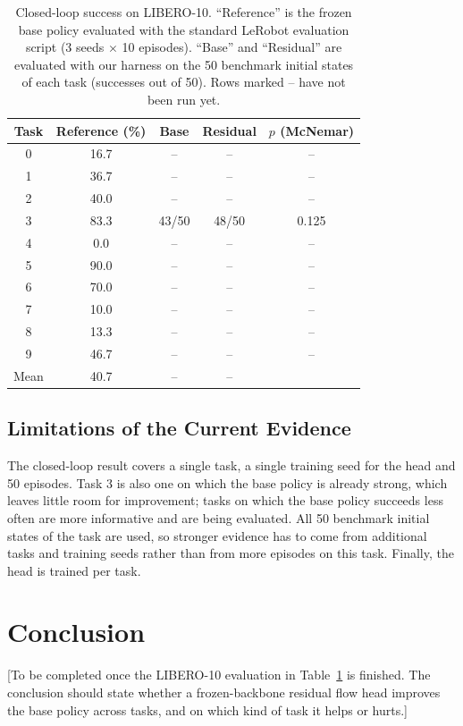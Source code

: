\documentclass[conference]{IEEEtran}
\begin{document}
\begin{table}[t]
\centering
\caption{Closed-loop success on LIBERO-10. ``Reference'' is the frozen base policy evaluated with the standard LeRobot evaluation script (3 seeds $\times$ 10 episodes). ``Base'' and ``Residual'' are evaluated with our harness on the 50 benchmark initial states of each task (successes out of 50). Rows marked -- have not been run yet.}
\label{tab:results}
\begin{tabular}{ccccc}
\toprule
Task & Reference (\%) & Base & Residual & $p$ (McNemar) \\
\midrule
0 & 16.7 & -- & -- & -- \\
1 & 36.7 & -- & -- & -- \\
2 & 40.0 & -- & -- & -- \\
3 & 83.3 & 43/50 & 48/50 & 0.125 \\
4 & 0.0  & -- & -- & -- \\
5 & 90.0 & -- & -- & -- \\
6 & 70.0 & -- & -- & -- \\
7 & 10.0 & -- & -- & -- \\
8 & 13.3 & -- & -- & -- \\
9 & 46.7 & -- & -- & -- \\
\midrule
Mean & 40.7 & -- & -- & \\
\bottomrule
\end{tabular}
\end{table}

\subsection{Limitations of the Current Evidence}
The closed-loop result covers a single task, a single training seed for the head and 50 episodes. Task 3 is also one on which the base policy is already strong, which leaves little room for improvement; tasks on which the base policy succeeds less often are more informative and are being evaluated. All 50 benchmark initial states of the task are used, so stronger evidence has to come from additional tasks and training seeds rather than from more episodes on this task. Finally, the head is trained per task.

\section{Conclusion}

[To be completed once the LIBERO-10 evaluation in Table~\ref{tab:results} is finished. The conclusion should state whether a frozen-backbone residual flow head improves the base policy across tasks, and on which kind of task it helps or hurts.]
\end{document}
